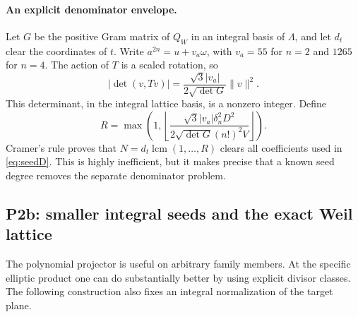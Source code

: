 \documentclass[11pt,a4paper]{article}
\theoremstyle{definition}\newtheorem{definition}[theorem]{Definition}
\theoremstyle{remark}\newtheorem{remark}[theorem]{Remark}
\begin{document}
\paragraph{An explicit denominator envelope.}
Let $G$ be the positive Gram matrix of $Q_W$ in an integral basis of $\Lambda$, and let $d_t$ clear the coordinates of $t$. Write $a^{2n}=u+v_a\omega$, with $v_a=55$ for $n=2$ and $1265$ for $n=4$. The action of $T$ is a scaled rotation, so
\[
 |\det(v,Tv)|=\frac{\sqrt3|v_a|}{2\sqrt{\det G}}\|v\|^2.
\]
This determinant, in the integral lattice basis, is a nonzero integer. Define
\[
 R=\max\left(1,\left\lfloor
 \frac{\sqrt3|v_a|\delta_n^2D^2}{2\sqrt{\det G}(n!)^2V}
 \right\rfloor\right).
\]
Cramer's rule proves that $N=d_t\operatorname{lcm}(1,\ldots,R)$ clears all coefficients used in \eqref{eq:seedD}. This is highly inefficient, but it makes precise that a known seed degree removes the separate denominator problem.


\subsection*{P2b: smaller integral seeds and the exact Weil lattice}
The polynomial projector is useful on arbitrary family members. At the specific elliptic product one can do substantially better by using explicit divisor classes. The following construction also fixes an integral normalization of the target plane.
\end{document}
